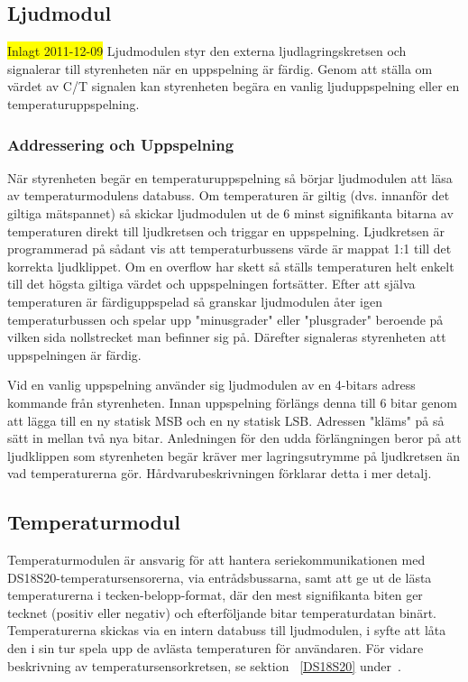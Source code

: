 \documentclass[a4paper,11pt]{article}
\begin{document}
	\subsection{Ljudmodul}
	\colorbox{yellow}{Inlagt 2011-12-09}
		Ljudmodulen styr den externa ljudlagringskretsen och signalerar till styrenheten när en uppspelning är färdig. Genom att ställa om värdet av C/T signalen kan styrenheten begära en vanlig ljuduppspelning eller en temperaturuppspelning.

		\subsubsection{Addressering och Uppspelning}
När styrenheten begär en temperaturuppspelning så börjar ljudmodulen att läsa av temperaturmodulens databuss. Om temperaturen är giltig (dvs. innanför det giltiga mätspannet) så skickar ljudmodulen ut de 6 minst signifikanta bitarna av temperaturen direkt till ljudkretsen och triggar en uppspelning. Ljudkretsen är programmerad på sådant vis att temperaturbussens värde är mappat 1:1 till det korrekta ljudklippet.  Om en overflow har skett så ställs temperaturen helt enkelt till det högsta giltiga värdet och uppspelningen fortsätter. Efter att själva temperaturen är färdiguppspelad så granskar ljudmodulen åter igen temperaturbussen och spelar upp "minusgrader" eller "plusgrader" beroende på vilken sida nollstrecket man befinner sig på. Därefter signaleras styrenheten att uppspelningen är färdig.

Vid en vanlig uppspelning använder sig ljudmodulen av en 4-bitars adress kommande från styrenheten. Innan uppspelning förlängs denna till 6 bitar genom att lägga till en ny statisk MSB och en ny statisk LSB. Adressen "kläms" på så sätt in mellan två nya bitar. Anledningen för den udda förlängningen beror på att ljudklippen som styrenheten begär kräver mer lagringsutrymme på ljudkretsen än vad temperaturerna gör. Hårdvarubeskrivningen förklarar detta i mer detalj.

	\subsection{Temperaturmodul}

	Temperaturmodulen är ansvarig för att hantera seriekommunikationen med 
	DS18S20-temperatursensorerna, via entrådsbussarna, samt att ge ut de lästa temperaturerna
	i tecken-belopp-format, där den mest signifikanta biten ger tecknet (positiv eller negativ) och efterföljande bitar temperaturdatan binärt.
	Temperaturerna skickas via en intern databuss till ljudmodulen, i syfte att låta den i sin tur spela upp de avlästa temperaturen för användaren. 
	För vidare beskrivning av temperatursensorkretsen, se sektion ~\ref{DS18S20} under~.
\end{document}
